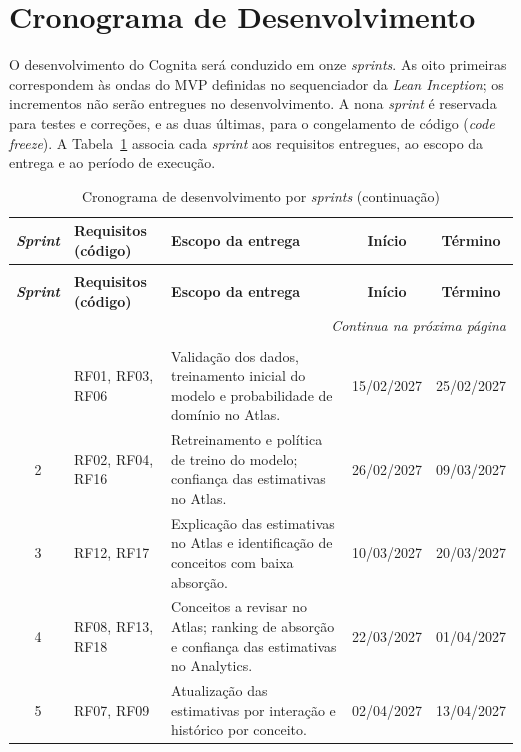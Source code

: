 \section{Cronograma de Desenvolvimento}
\label{sec:cronograma}

O desenvolvimento do Cognita será conduzido em onze \textit{sprints}. As
oito primeiras correspondem às ondas do MVP definidas no sequenciador da
\textit{Lean Inception}; os incrementos
não serão entregues no desenvolvimento. A nona \textit{sprint} é
reservada para testes e correções, e as duas últimas, para o congelamento de código
(\textit{code freeze}). A Tabela~\ref{tab:cronograma-ondas} associa cada
\textit{sprint} aos requisitos entregues, ao escopo da entrega e ao período
de execução.

{\small
\begin{longtable}{c>{\raggedright\arraybackslash}p{2.3cm}>{\raggedright\arraybackslash}p{6.3cm}cc}
\caption{Cronograma de desenvolvimento por \textit{sprints}}
\label{tab:cronograma-ondas} \\
\hline
\textbf{\textit{Sprint}} & \textbf{Requisitos (código)} & \textbf{Escopo da entrega} & \textbf{Início} & \textbf{Término} \\
\hline
\endfirsthead
\caption[]{Cronograma de desenvolvimento por \textit{sprints} (continuação)} \\
\hline
\textbf{\textit{Sprint}} & \textbf{Requisitos (código)} & \textbf{Escopo da entrega} & \textbf{Início} & \textbf{Término} \\
\hline
\endhead
\hline
\multicolumn{5}{r}{\textit{Continua na próxima página}} \\
\endfoot
\hline
\multicolumn{5}{l}{Fonte: Dos autores.} \\
\endlastfoot
1 & RF01, RF03, RF06 & Validação dos dados, treinamento inicial do modelo e probabilidade de domínio no Atlas. & 15/02/2027 & 25/02/2027 \\
\hline
2 & RF02, RF04, RF16 & Retreinamento e política de treino do modelo; confiança das estimativas no Atlas. & 26/02/2027 & 09/03/2027 \\
\hline
3 & RF12, RF17 & Explicação das estimativas no Atlas e identificação de conceitos com baixa absorção. & 10/03/2027 & 20/03/2027 \\
\hline
4 & RF08, RF13, RF18 & Conceitos a revisar no Atlas; ranking de absorção e confiança das estimativas no Analytics. & 22/03/2027 & 01/04/2027 \\
\hline
5 & RF07, RF09 & Atualização das estimativas por interação e histórico por conceito. & 02/04/2027 & 13/04/2027 \\

\end{longtable}}
